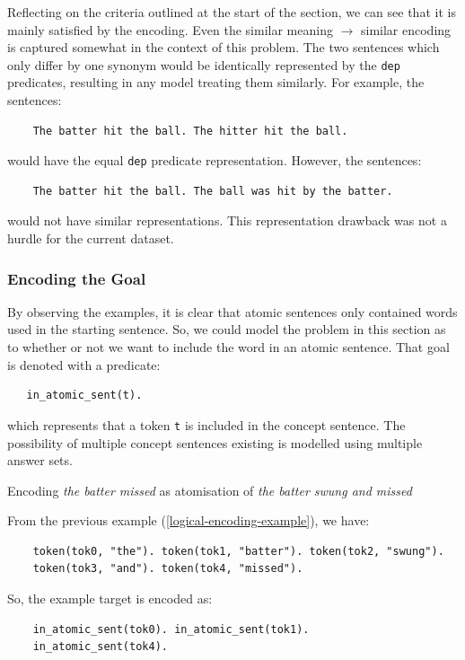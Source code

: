 Reflecting on the criteria outlined at the start of the section, we can see that it is mainly satisfied by the encoding. 
Even the similar meaning $\rightarrow$ similar encoding is captured somewhat in the context of this problem.
The two sentences which only differ by one synonym would be identically represented by the \verb_dep_ predicates, resulting in any model treating them similarly.
For example, the sentences:
\begin{verbatim}
    The batter hit the ball. The hitter hit the ball.
\end{verbatim}
would have the equal \verb_dep_ predicate representation. 
However, the sentences:
\begin{verbatim}
    The batter hit the ball. The ball was hit by the batter.
\end{verbatim}
would not have similar representations.
This representation drawback was not a hurdle for the current dataset.

\subsubsection{Encoding the Goal}
\label{encoding-the-example-target}

By observing the examples, it is clear that atomic sentences only contained words used in the starting sentence.
So, we could model the problem in this section as to whether or not we want to include the word in an atomic sentence.
That goal is denoted with a predicate:
\begin{verbatim}
   in_atomic_sent(t).
\end{verbatim}
which represents that a token \verb+t+ is included in the concept sentence.
The possibility of multiple concept sentences existing is modelled using multiple answer sets.
\begin{example}
\label{example-encoding-target}
Encoding \textit{the batter missed} as atomisation of \textit{the batter swung and missed}

From the previous example (\ref{logical-encoding-example}), we have:
\begin{verbatim}
    token(tok0, "the"). token(tok1, "batter"). token(tok2, "swung").
    token(tok3, "and"). token(tok4, "missed").
\end{verbatim}
So, the example target is encoded as:
\begin{verbatim}
    in_atomic_sent(tok0). in_atomic_sent(tok1).
    in_atomic_sent(tok4).
\end{verbatim}

\end{example}


